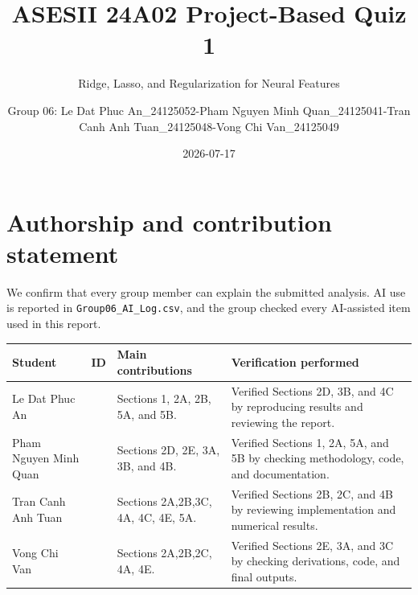 \documentclass[
  11pt,
]{article}
\title{ASESII 24A02 Project-Based Quiz 1}
\subtitle{Ridge, Lasso, and Regularization for Neural Features}
\author{Group 06: Le Dat Phuc An\_24125052-Pham Nguyen Minh
Quan\_24125041-Tran Canh Anh Tuan\_24125048-Vong Chi Van\_24125049}
\date{2026-07-17}
\newcounter{none} %
\begin{document}
\maketitle

{
\setcounter{tocdepth}{2}
\tableofcontents
}
\section*{Authorship and contribution
statement}\label{authorship-and-contribution-statement}

We confirm that every group member can explain the submitted analysis.
AI use is reported in \texttt{Group06\_AI\_Log.csv}, and the group
checked every AI-assisted item used in this report.

{\def\LTcaptype{none} %
\begin{longtable}[]{@{}
  >{\raggedright\arraybackslash}p{}
  >{\raggedleft\arraybackslash}p{}
  >{\raggedright\arraybackslash}p{}
  >{\raggedright\arraybackslash}p{}@{}}
\toprule\noalign{}
\begin{minipage}[b]{\linewidth}\raggedright
Student
\end{minipage} & \begin{minipage}[b]{\linewidth}\raggedleft
ID
\end{minipage} & \begin{minipage}[b]{\linewidth}\raggedright
Main contributions
\end{minipage} & \begin{minipage}[b]{\linewidth}\raggedright
Verification performed
\end{minipage} \\
\midrule\noalign{}
\endhead
\bottomrule\noalign{}
\endlastfoot
Le Dat Phuc An & 24125052 & Sections 1, 2A, 2B, 5A, and 5B. & Verified
Sections 2D, 3B, and 4C by reproducing results and reviewing the
report. \\
Pham Nguyen Minh Quan & 24125041 & Sections 2D, 2E, 3A, 3B, and 4B. &
Verified Sections 1, 2A, 5A, and 5B by checking methodology, code, and
documentation. \\
Tran Canh Anh Tuan & 24125048 & Sections 2A,2B,3C, 4A, 4C, 4E, 5A. &
Verified Sections 2B, 2C, and 4B by reviewing implementation and
numerical results. \\
Vong Chi Van & 24125049 & Sections 2A,2B,2C, 4A, 4E. & Verified Sections
2E, 3A, and 3C by checking derivations, code, and final outputs. \\
\end{longtable}
}
\end{document}
